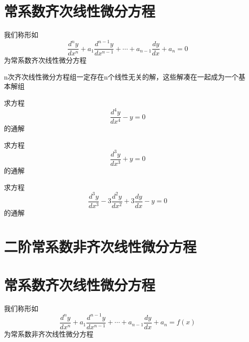 \documentclass[lang=cn,14pt]{elegantbook}
\begin{document}
	\section{常系数齐次线性微分方程}
	\begin{definition}[常系数齐次线性微分方程]
		我们称形如
		\begin{equation*}
			\frac{d^ny}{dx^n}+a_1\frac{d^{n-1}y}{dx^{n-1}}+\cdots +a_{n-1}\frac{dy}{dx}+a_n=0
		\end{equation*}
		为常系数齐次线性微分方程
	\end{definition}
	\begin{remark}
		n次齐次线性微分方程组一定存在n个线性无关的解，这些解凑在一起成为一个基本解组
	\end{remark}
	\begin{note}
		\vspace{4cm}
	\end{note}
	\begin{example}
		求方程
		\begin{equation*}
			\frac{d^4y}{dx^4}-y=0
		\end{equation*}
		的通解
	\end{example}
	\vspace{2cm}
	\begin{example}
		求方程
		\begin{equation*}
			\frac{d^3y}{dx^3}+y=0
		\end{equation*}
		的通解
	\end{example}
	\vspace{2cm}
		\begin{example}
		求方程
		\begin{equation*}
			\frac{d^3y}{dx^3}-3\frac{d^2y}{dx^2}+3\frac{dy}{dx}-y=0
		\end{equation*}
		的通解
	\end{example}
	\vspace{2cm}
	\section{二阶常系数非齐次线性微分方程}
		\section{常系数齐次线性微分方程}
	\begin{definition}[常系数非齐次线性微分方程]
		我们称形如
		\begin{equation*}
			\frac{d^ny}{dx^n}+a_1\frac{d^{n-1}y}{dx^{n-1}}+\cdots +a_{n-1}\frac{dy}{dx}+a_n=f(x)
		\end{equation*}
		为常系数非齐次线性微分方程
	\end{definition}
	\begin{note}
		\vspace{5cm}
	\end{note}
\end{document}
